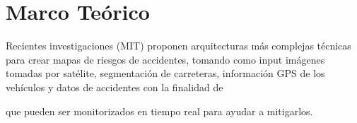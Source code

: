 
\chapter{Marco Teórico}
\label{marcoteorico}


Recientes investigaciones (MIT) proponen arquitecturas más complejas técnicas para crear mapas de riesgos de accidentes, tomando como input imágenes tomadas por satélite, segmentación de carreteras, información GPS de los vehículos y datos de accidentes con la finalidad de

que pueden ser monitorizados en tiempo real para ayudar a mitigarlos.

